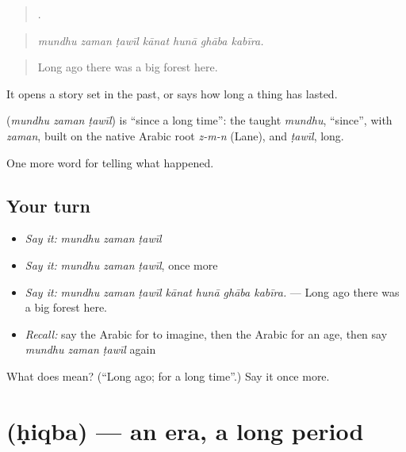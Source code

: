 \begin{quote}
      .
\end{quote}

\begin{quote}
\emph{mundhu zaman ṭawīl kānat hunā ghāba kabīra.}
\end{quote}

\begin{quote}
Long ago there was a big forest here.
\end{quote}

It opens a story set in the past, or says how long a thing has lasted.

\begin{cousinweb}
\textbf{  } (\emph{mundhu zaman ṭawīl}) is \textquotedblleft{}since a long time\textquotedblright{}: the taught \emph{mundhu}, \textquotedblleft{}since\textquotedblright{}, with \emph{zaman}, built on the native Arabic root \emph{z-m-n} (Lane), and \emph{ṭawīl}, long.
\end{cousinweb}

\begin{grammarlens}[title={What you've built}]
One more word for telling what happened.
\end{grammarlens}

\subsection*{Your turn}
\begin{itemize}
\raggedright
  \item \emph{Say it:} \emph{mundhu zaman ṭawīl}
  \item \emph{Say it:} \emph{mundhu zaman ṭawīl}, once more
  \item \emph{Say it:} \emph{mundhu zaman ṭawīl kānat hunā ghāba kabīra.} — Long ago there was a big forest here.
  \item \emph{Recall:} say the Arabic for to imagine, then the Arabic for an age, then say \emph{mundhu zaman ṭawīl} again
\end{itemize}

\begin{tcolorbox}[breakable,colback=teal!4,colframe=teal!35!black,title={Before you move on}]
What does    mean? (\textquotedblleft{}Long ago; for a long time\textquotedblright{}.) Say it once more.
\end{tcolorbox}
\section[\texorpdfstring{\ar{حقبة} (ḥiqba)}{حقبة (ḥiqba)}]{ (ḥiqba) — an era, a long period}


